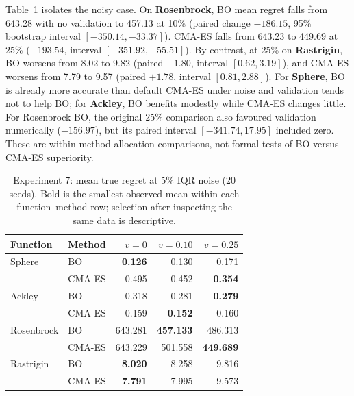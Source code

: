 \documentclass[11pt,a4paper]{article}
\begin{document}
Table~\ref{tab:main} isolates the noisy case. On \textbf{Rosenbrock}, BO mean regret falls from 643.28 with no validation to 457.13 at 10\% (paired change $-186.15$, 95\% bootstrap interval $[-350.14,-33.37]$). CMA-ES falls from 643.23 to 449.69 at 25\% ($-193.54$, interval $[-351.92,-55.51]$). By contrast, at 25\% on \textbf{Rastrigin}, BO worsens from 8.02 to 9.82 (paired $+1.80$, interval $[0.62,3.19]$), and CMA-ES worsens from 7.79 to 9.57 (paired $+1.78$, interval $[0.81,2.88]$). For \textbf{Sphere}, BO is already more accurate than default CMA-ES under noise and validation tends not to help BO; for \textbf{Ackley}, BO benefits modestly while CMA-ES changes little. For Rosenbrock BO, the original 25\% comparison also favoured validation numerically ($-156.97$), but its paired interval $[-341.74,17.95]$ included zero. These are within-method allocation comparisons, not formal tests of BO versus CMA-ES superiority.

\begin{table}[t]
\centering\small
\caption{Experiment 7: mean true regret at 5\% IQR noise (20 seeds). Bold is the smallest observed mean within each function--method row; selection after inspecting the same data is descriptive.}
\label{tab:main}
\begin{tabular}{llrrr}\toprule
Function & Method & $v=0$ & $v=0.10$ & $v=0.25$\\\midrule
Sphere & BO & \textbf{0.126} & 0.130 & 0.171\\
 & CMA-ES & 0.495 & 0.452 & \textbf{0.354}\\
Ackley & BO & 0.318 & 0.281 & \textbf{0.279}\\
 & CMA-ES & 0.159 & \textbf{0.152} & 0.160\\
Rosenbrock & BO & 643.281 & \textbf{457.133} & 486.313\\
 & CMA-ES & 643.229 & 501.558 & \textbf{449.689}\\
Rastrigin & BO & \textbf{8.020} & 8.258 & 9.816\\
 & CMA-ES & \textbf{7.791} & 7.995 & 9.573\\\bottomrule
\end{tabular}
\end{table}
\end{document}
